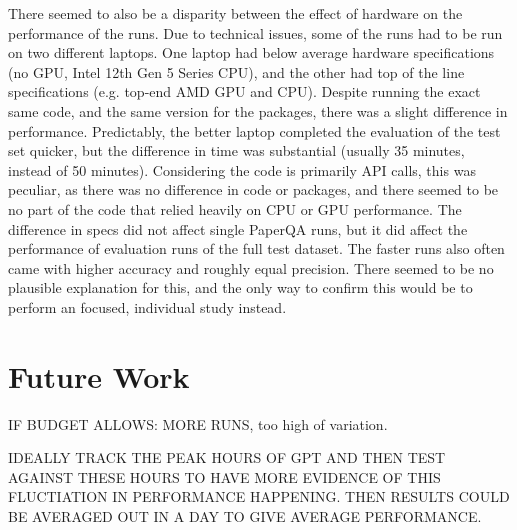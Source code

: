There seemed to also be a disparity between the effect of hardware on the performance of the runs. Due to technical issues, some of the runs had to be run on two different laptops. One laptop had below average hardware specifications (no GPU, Intel 12th Gen 5 Series CPU), and the other had top of the line specifications (e.g. top-end AMD GPU and CPU). Despite running the exact same code, and the same version for the packages, there was a slight difference in performance. Predictably, the better laptop completed the evaluation of the test set quicker, but the difference in time was substantial (usually 35 minutes, instead of 50 minutes). Considering the code is primarily API calls, this was peculiar, as there was no difference in code or packages, and there seemed to be no part of the code that relied heavily on CPU or GPU performance. 
The difference in specs did not affect single PaperQA runs, but it did affect the performance of evaluation runs of the full test dataset. The faster runs also often came with higher accuracy and roughly equal precision. There seemed to be no plausible explanation for this, and the only way to confirm this would be to perform an focused, individual study instead. 



\section{Future Work}

IF BUDGET ALLOWS: MORE RUNS, too high of variation. 

IDEALLY TRACK THE PEAK HOURS OF GPT AND THEN TEST AGAINST THESE HOURS TO HAVE MORE EVIDENCE OF THIS FLUCTIATION IN PERFORMANCE HAPPENING. THEN RESULTS COULD BE AVERAGED OUT IN A DAY TO GIVE AVERAGE PERFORMANCE. 


